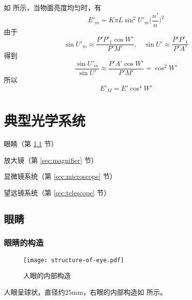 \documentclass[cn,10pt,chinesefont=founder,math=newtx,cite=super,twoside]{elegantbook}
\begin{document}
如 所示，当物面亮度均匀时，有
\begin{equation}
E'_m=K\pi L\sin^2U'_m\bigg(\frac{n'}{n}\bigg)^2
\end{equation}
由于
\begin{equation}
\sin U'_m\approx\frac{P'P'_1\cos W'}{P'M'},\quad\sin U'\approx\frac{P'P'_1}{P'A'}
\end{equation}
得到
\begin{equation}
\frac{\sin U'_m}{\sin U'}\approx\frac{P'A'\cos W'}{P'M'}=\cos^2 W'
\end{equation}
所以
\begin{equation}
E'_M=E'\cos^4 W'
\end{equation}

\chapter{典型光学系统}

\begin{introduction}
	\item 眼睛（第 \ref{sec:eye} 节）
	\item 放大镜（第 \ref{sec:magnifier} 节）
	\item 显微镜系统（第 \ref{sec:microscope} 节）
	\item 望远镜系统（第 \ref{sec:telescope} 节）
\end{introduction}

\section{眼睛}
\label{sec:eye}
\subsection{眼睛的构造}

\begin{figure}[htbp]
	\centering
	\texttt{[image: structure-of-eye.pdf]}
	\caption{人眼的内部构造}
	\label{fig:structure-of-eye}
\end{figure}

人眼呈球状，直径约$25\mathrm{mm}$，右眼的内部构造如 所示。
\end{document}
